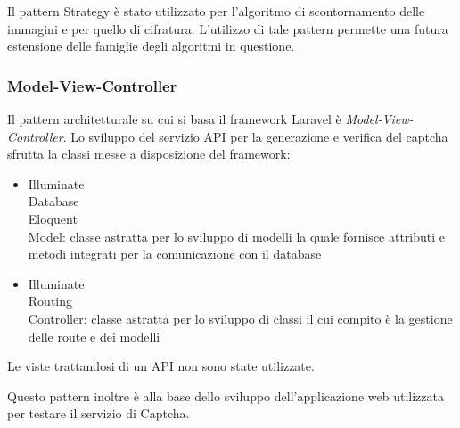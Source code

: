 Il pattern Strategy è stato utilizzato per l'algoritmo di scontornamento delle immagini e per quello di cifratura.
L'utilizzo di tale pattern permette una futura estensione delle famiglie degli algoritmi in questione.


\subsubsection{Model-View-Controller}
Il pattern architetturale su cui si basa il framework Laravel è \textit{Model-View-Controller}.
Lo sviluppo del servizio API per la generazione e verifica del captcha sfrutta la classi messe a disposizione del framework:
\begin{itemize}
    \item Illuminate\\Database\\Eloquent\\Model: classe astratta per lo sviluppo di modelli la quale fornisce attributi e metodi integrati per la comunicazione con il database
    \item Illuminate\\Routing\\Controller: classe astratta per lo sviluppo di classi il cui compito è la gestione delle route e dei modelli
\end{itemize}
Le viste trattandosi di un API non sono state utilizzate.

Questo pattern inoltre è alla base dello sviluppo dell'applicazione web utilizzata per testare il servizio di Captcha.